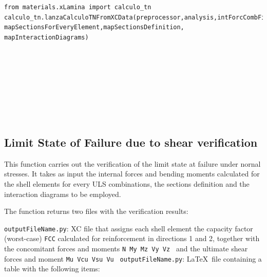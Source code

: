  
\begin{verbatim}
from materials.xLamina import calculo_tn
calculo_tn.lanzaCalculoTNFromXCData(preprocessor,analysis,intForcCombFileName,outputFileName, 
mapSectionsForEveryElement,mapSectionsDefinition, mapInteractionDiagrams)
\end{verbatim}
\begin{paramFuncTable}
\preprocessor{} \\
\analysis{} \\
\\
\outputFileName{}\\
\mapSectionsForEveryElement{} \\
\mapSectionsDefinition{} \\
\mapInteractionDiagrams{} \\
\end{paramFuncTable}


\subsection{Limit State of Failure due to shear verification}
This function carries out the verification of the limit state at failure under nornal stresses. It takes as input the internal forces and bending moments calculated for the shell elements for every ULS combinations, the sections definition and the interaction diagrams to be employed.

The function returns two files with the verification results:

{\tt outputFileName.py}: XC file that assigns each shell element the capacity factor (worst-case) {\tt FCC} calculated for reinforcement in directions 1 and 2, together with the concomitant forces and moments {\tt N My Mz  Vy Vz } and the ultimate shear forces and moment {\tt Mu Vcu Vsu Vu }
{\tt outputFileName.py}: \LaTeX\  file containing a table with the following items:

